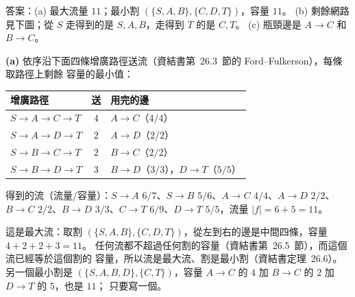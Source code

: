 \begin{pastsoln}
答案：(a) 最大流量 $11$；最小割 $(\{S, A, B\}, \{C, D, T\})$，容量 $11$。 (b) 剩餘網路見下圖；從 $S$
走得到的是 $S, A, B$，走得到 $T$ 的是 $C, T$。 (c) 瓶頸邊是 $A \to C$ 和 $B \to C$。

\textbf{(a)} 依序沿下面四條增廣路徑送流（資結書第~26.3~節的 Ford--Fulkerson），每條取路徑上剩餘
容量的最小值：
\begin{center}
\small
\begin{tabular}{lcl}
\toprule
增廣路徑 & 送 & 用完的邊 \\
\midrule
$S \to A \to C \to T$ & $4$ & $A \to C$（$4/4$） \\
$S \to A \to D \to T$ & $2$ & $A \to D$（$2/2$） \\
$S \to B \to C \to T$ & $2$ & $B \to C$（$2/2$） \\
$S \to B \to D \to T$ & $3$ & $B \to D$（$3/3$），$D \to T$（$5/5$） \\
\bottomrule
\end{tabular}
\end{center}
得到的流（流量/容量）：$S \to A$ $6/7$、$S \to B$ $5/6$、$A \to C$ $4/4$、$A \to D$ $2/2$、
$B \to C$ $2/2$、$B \to D$ $3/3$、$C \to T$ $6/9$、$D \to T$ $5/5$，流量 $|f| = 6 + 5 = 11$。

這是最大流：取割 $(\{S, A, B\}, \{C, D, T\})$，從左到右的邊是中間四條，容量
$4 + 2 + 2 + 3 = 11$。 任何流都不超過任何割的容量（資結書第~26.5~節），而這個流已經等於這個割的
容量，所以流是最大流、割是最小割（資結書定理~26.6）。 另一個最小割是
$(\{S, A, B, D\}, \{C, T\})$，容量 $A \to C$ 的 $4$ 加 $B \to C$ 的 $2$ 加 $D \to T$ 的 $5$，也是 $11$；
只要寫一個。


\end{pastsoln}

